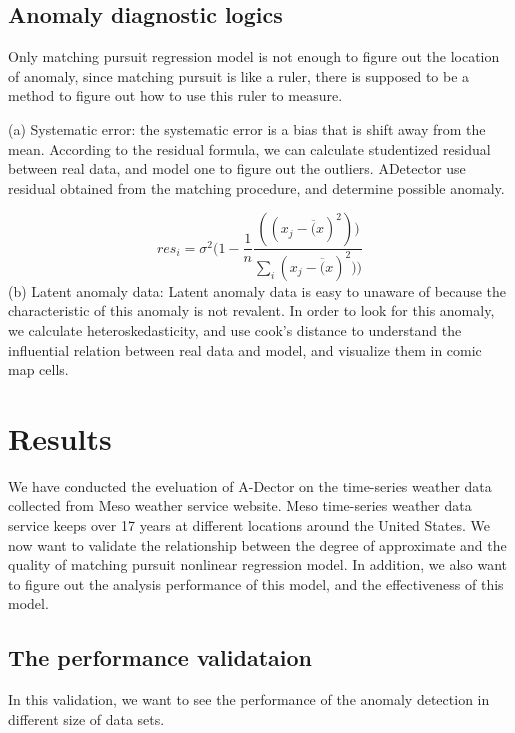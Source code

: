 \documentclass{vgtc}                          %
\begin{document}
\subsection{Anomaly diagnostic logics}
	Only matching pursuit regression model is not enough to figure out the location of anomaly, since matching pursuit is like a ruler, there is supposed to be a method to figure out how to use this ruler to measure.
	
		(a) Systematic error: the systematic error is a bias that is shift away from the mean. According to the residual formula, we can calculate studentized residual between real data, and model one to figure out the outliers. ADetector use residual obtained from the matching procedure, and determine possible anomaly.
			
	\begin{equation}
	 res_i = \sigma^2 ( 1 -\frac{1}{n} \frac{((x_j - \overline(x)^2))}{\sum_i(x_j - \overline(x)^2))}
	\end{equation}		 
		(b) Latent anomaly data: Latent anomaly data is easy to unaware of because the characteristic of this anomaly is not revalent. In order to look for this anomaly, we calculate heteroskedasticity, and use cook's distance to understand the influential relation between real data and model, and visualize them in comic map cells. 

\section{Results}

We have conducted the eveluation of A-Dector on the time-series weather data collected from Meso weather service website. Meso time-series weather data service keeps over 17 years at different locations around the United States. We now want to validate the relationship between the degree of approximate and the quality of matching pursuit nonlinear regression model. In addition, we also want to figure out the analysis performance of this model, and the effectiveness of this model.

\subsection{The performance validataion}

	In this validation, we want to see the performance of the anomaly detection in different size of data sets. 
\end{document}
